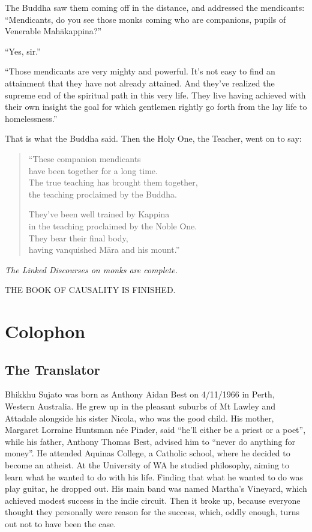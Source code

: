 \documentclass[12pt,openany]{book}%
\newcommand*{\scendsutta}[1]{\begin{center}\textit{#1}\end{center}}
\newcommand*{\scendbook}[1]{\begin{center}\uppercase{#1}\end{center}}
\let\oldbackmatter\backmatter
\renewcommand{\backmatter}{%
\chapterfont{\setstretch{.85}\normalfont\centering}%
\sectionfont{\setstretch{.85}\Semiboldsubheadfont}%
\oldbackmatter}
\begin{document}
The Buddha saw them coming off in the distance, and addressed the mendicants: “Mendicants, do you see those monks coming who are companions, pupils of Venerable \textsanskrit{Mahākappina}?” 

“Yes, sir.” 

“Those mendicants are very mighty and powerful. It’s not easy to find an attainment that they have not already attained. And they’ve realized the supreme end of the spiritual path in this very life. They live having achieved with their own insight the goal for which gentlemen rightly go forth from the lay life to homelessness.” 

That is what the Buddha said. Then the Holy One, the Teacher, went on to say: 

\begin{verse}%
“These companion mendicants \\
have been together for a long time. \\
The true teaching has brought them together, \\
the teaching proclaimed by the Buddha. 

They’ve been well trained by Kappina \\
in the teaching proclaimed by the Noble One. \\
They bear their final body, \\
having vanquished \textsanskrit{Māra} and his mount.” 

%
\end{verse}

\scendsutta{The Linked Discourses on monks are complete. }

\scendbook{The Book of Causality is finished. }

%
\backmatter%
\chapter*{Colophon}

\section*{The Translator}

Bhikkhu Sujato was born as Anthony Aidan Best on 4/11/1966 in Perth, Western Australia. He grew up in the pleasant suburbs of Mt Lawley and Attadale alongside his sister Nicola, who was the good child. His mother, Margaret Lorraine Huntsman née Pinder, said “he’ll either be a priest or a poet”, while his father, Anthony Thomas Best, advised him to “never do anything for money”. He attended Aquinas College, a Catholic school, where he decided to become an atheist. At the University of WA he studied philosophy, aiming to learn what he wanted to do with his life. Finding that what he wanted to do was play guitar, he dropped out. His main band was named Martha’s Vineyard, which achieved modest success in the indie circuit. Then it broke up, because everyone thought they personally were reason for the success, which, oddly enough, turns out not to have been the case. 
\end{document}
